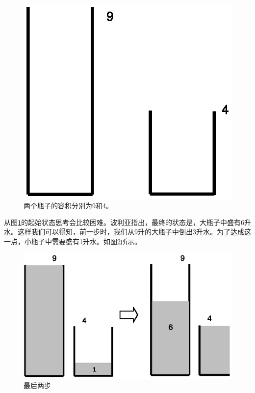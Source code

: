 \documentclass[UTF8]{article}
\begin{document}
\begin{figure}[htbp]
 \centering
 \includegraphics[scale=0.5]{img/jugs-start.eps}
 \caption{两个瓶子的容积分别为9和4。}
 \label{fig:jugs-start}
\end{figure}

从图\ref{fig:jugs-start}的起始状态思考会比较困难。波利亚指出，最终的状态是，大瓶子中盛有6升水。这样我们可以得知，前一步时，我们从9升的大瓶子中倒出3升水。为了达成这一点，小瓶子中需要盛有1升水。如图\ref{fig:jugs-r1}所示。

\begin{figure}[htbp]
 \centering
 \includegraphics[scale=0.5]{img/jugs-r1.eps}
 \caption{最后两步}
 \label{fig:jugs-r1}
\end{figure}
\end{document}
